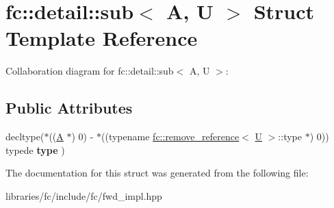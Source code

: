\hypertarget{structfc_1_1detail_1_1sub}{}\section{fc\+:\+:detail\+:\+:sub$<$ A, U $>$ Struct Template Reference}
\label{structfc_1_1detail_1_1sub}


Collaboration diagram for fc\+:\+:detail\+:\+:sub$<$ A, U $>$\+:
\subsection*{Public Attributes}
\begin{DoxyCompactItemize}
\item 
\mbox{\label{structfc_1_1detail_1_1sub_a1fb0e80b3b8e428ec303d40145b502d3}} 
decltype($\ast$((\mbox{\hyperlink{struct_a}{A}} $\ast$) 0) -\/ $\ast$((typename \mbox{\hyperlink{structfc_1_1remove__reference}{fc\+::remove\+\_\+reference}}$<$ \mbox{\hyperlink{union_u}{U}} $>$\+::type $\ast$) 0)) typede {\bfseries type} )
\end{DoxyCompactItemize}


The documentation for this struct was generated from the following file\+:\begin{DoxyCompactItemize}
\item 
libraries/fc/include/fc/fwd\+\_\+impl.\+hpp\end{DoxyCompactItemize}
